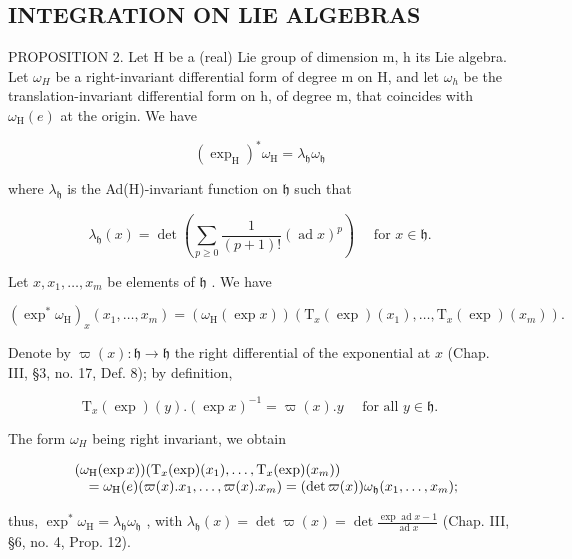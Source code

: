 \subsection{INTEGRATION ON LIE ALGEBRAS}

PROPOSITION 2. Let H be a (real) Lie group of dimension m, h its Lie algebra. Let \(\omega_{H}\) be a right-invariant differential form of degree m on H, and let \(\omega_{h}\) be the translation-invariant differential form on h, of degree m, that coincides with \(\omega_{\mathrm{H}}(e)\) at the origin. We have

\[
(\exp_ {\mathrm{H}}) ^ {*} \omega_ {\mathrm{H}} = \lambda_ {\mathfrak {h}} \omega_ {\mathfrak {h}}\tag{10}
\]

where \(\lambda_{\mathfrak{h}}\) is the Ad(H)-invariant function on \(\mathfrak{h}\) such that

\[
\lambda_ {\mathfrak {h}} (x) = \det \left(\sum_ {p \geq 0} \frac {1}{(p + 1) !} (\operatorname{ad} x) ^ {p}\right) \quad \text { for } x \in \mathfrak {h}.
\]

Let \(x, x_1, \ldots, x_m\) be elements of \(\mathfrak{h}\) . We have

\[
(\exp^ {*} \omega_ {\mathrm{H}}) _ {x} (x _ {1}, \dots , x _ {m}) = (\omega_ {\mathrm{H}} (\exp x)) (\mathrm{T} _ {x} (\exp) (x _ {1}), \dots , \mathrm{T} _ {x} (\exp) (x _ {m})).
\]

Denote by \(\varpi(x) : \mathfrak{h} \to \mathfrak{h}\) the right differential of the exponential at \(x\) (Chap. III, §3, no. 17, Def. 8); by definition,

\[
\mathrm{T} _ {x} (\exp) (y). (\exp x) ^ {- 1} = \varpi (x). y \quad \text { for   all } y \in \mathfrak {h}.
\]

The form \(\omega_{H}\) being right invariant, we obtain

\[
\begin{array}{r l} & (\omega_ {\mathrm{H}} (\exp x)) (\mathrm{T} _ {x} (\exp) (x _ {1}), \ldots , \mathrm{T} _ {x} (\exp) (x _ {m})) \\ & \quad = \omega_ {\mathrm{H}} (e) (\varpi (x). x _ {1}, \ldots , \varpi (x). x _ {m}) = (\det \varpi (x)) \omega_ {\mathfrak {h}} (x _ {1}, \ldots , x _ {m}); \end{array}
\]

thus, \(\exp^{*}\omega_{\mathrm{H}} = \lambda_{\mathfrak{h}}\omega_{\mathfrak{h}}\) , with \(\lambda_{\mathfrak{h}}(x) = \det \varpi(x) = \det \frac{\exp\operatorname{ad} x - 1}{\operatorname{ad} x}\) (Chap. III, §6, no. 4, Prop. 12).

